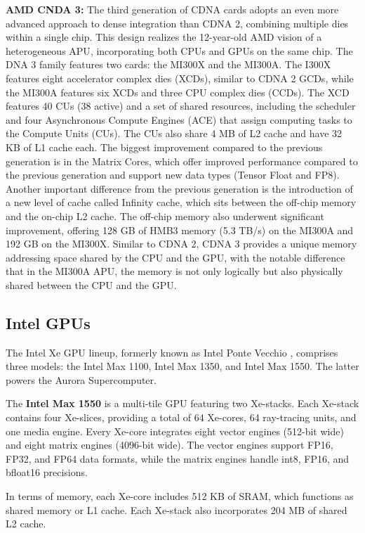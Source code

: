 \textbf{AMD CNDA 3:} The third generation of CDNA cards adopts an even more advanced approach to dense integration than CDNA 2, combining multiple dies within a single chip. This design realizes the 12-year-old AMD vision of a heterogeneous APU\cite{Smith2024}, incorporating both CPUs and GPUs on the same chip. The  DNA 3 family features two cards: the MI300X and the MI300A. The  I300X features eight accelerator complex dies (XCDs), similar to CDNA 2 GCDs, while the MI300A features six XCDs and three CPU complex dies (CCDs). 
The XCD features 40 CUs (38 active) and a set of shared resources, including the scheduler and four Asynchronous Compute Engines (ACE) that assign computing tasks to the Compute Units (CUs). The CUs also share 4 MB of L2 cache and have 32 KB of L1 cache each.
The biggest improvement compared to the previous generation is in the Matrix Cores, which offer improved performance compared to the previous generation and support new data types (Tensor Float and FP8).
Another important difference from the previous generation is the introduction of a new level of cache called Infinity cache, which sits between the off-chip memory and the on-chip L2 cache. The off-chip memory also underwent significant improvement, offering 128 GB of HMB3 memory (5.3 TB/s) on the MI300A and 192 GB on the MI300X. Similar to CDNA 2, CDNA 3 provides a unique memory addressing space shared by the CPU and the GPU, with the notable difference that in the MI300A APU, the memory is not only logically but also physically shared between the CPU and the GPU.

\subsection{Intel GPUs}

The Intel Xe GPU lineup, formerly known as Intel Ponte Vecchio \cite{gomes2022ponte}, comprises three models: the Intel Max 1100, Intel Max 1350, and Intel Max 1550. The latter powers the Aurora Supercomputer.

The \textbf{Intel Max 1550} is a multi-tile GPU featuring two Xe-stacks. Each Xe-stack contains four Xe-slices, providing a total of 64 Xe-cores, 64 ray-tracing units, and one media engine. Every Xe-core integrates eight vector engines (512-bit wide) and eight matrix engines (4096-bit wide). The vector engines support FP16, FP32, and FP64 data formats, while the matrix engines handle int8, FP16, and bfloat16 precisions.

In terms of memory, each Xe-core includes 512 KB of SRAM, which functions as shared memory or L1 cache. Each Xe-stack also incorporates 204 MB of shared L2 cache.


